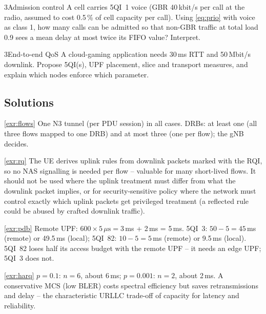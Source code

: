 \documentclass[11pt,a4paper]{article}
\begin{document}
\begin{exercisebox}{3}{Admission control}\label{exr:adm}
A cell carries 5QI~1 voice (GBR 40\,kbit/s per call at the radio, assumed to cost 0.5\,\% of cell capacity per call). Using \cref{eq:prio} with voice as class 1,
how many calls can be admitted so that non-GBR traffic at total load 0.9 sees a mean delay at most twice its FIFO value? Interpret.
\end{exercisebox}

\begin{exercisebox}{3}{End-to-end QoS}\label{exr:e2e}
A cloud-gaming application needs 30\,ms RTT and 50\,Mbit/s downlink. Propose 5QI(s), UPF placement, slice and transport measures, and explain which nodes enforce
which parameter.
\end{exercisebox}

\subsection*{Solutions}

\begin{solutionbox}{\ref{exr:flows}}
One N3 tunnel (per PDU session) in all cases. DRBs: at least one (all three flows mapped to one DRB) and at most three (one per flow); the gNB decides.
\end{solutionbox}

\begin{solutionbox}{\ref{exr:rq}}
The UE derives uplink rules from downlink packets marked with the RQI, so no NAS signalling is needed per flow -- valuable for many short-lived flows. It
should not be used where the uplink treatment must differ from what the downlink packet implies, or for security-sensitive policy where the network must
control exactly which uplink packets get privileged treatment (a reflected rule could be abused by crafted downlink traffic).
\end{solutionbox}

\begin{solutionbox}{\ref{exr:pdb}}
Remote UPF: $600\times5\,\mu\mathrm{s} = 3$\,ms + 2\,ms = 5\,ms. 5QI~3: $50 - 5 = 45$\,ms (remote) or 49.5\,ms (local); 5QI~82: $10 - 5 = 5$\,ms (remote) or 9.5\,ms
(local). 5QI~82 loses half its access budget with the remote UPF -- it needs an edge UPF; 5QI~3 does not.
\end{solutionbox}

\begin{solutionbox}{\ref{exr:harq}}
$p = 0.1$: $n = 6$, about 6\,ms; $p = 0.001$: $n = 2$, about 2\,ms. A conservative MCS (low BLER) costs spectral efficiency but saves retransmissions and delay -- the
characteristic URLLC trade-off of capacity for latency and reliability.
\end{solutionbox}
\end{document}

